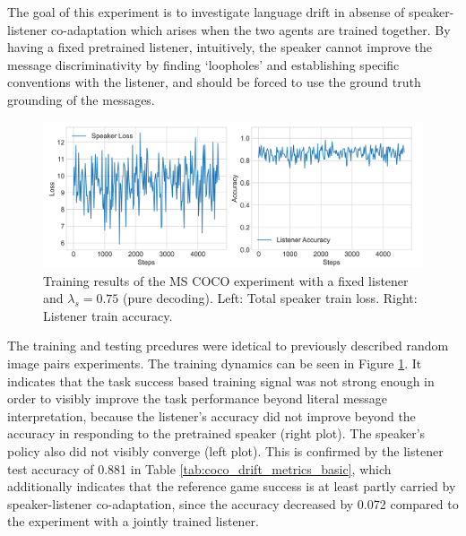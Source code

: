 The goal of this experiment is to investigate language drift in absense of speaker-listener co-adaptation which arises when the two agents are trained together. By having a fixed pretrained listener, intuitively, the speaker cannot improve the message discriminativity by finding `loopholes' and establishing specific conventions with the listener, and should be forced to use the ground truth grounding of the messages.

\begin{figure}
	\centering
	\includegraphics[width=\linewidth]{images/coco_fixedListener_baseline_random_075_losses.png}
	\caption{Training results of the MS COCO experiment with a fixed listener and $\lambda_s=0.75$ (pure decoding). Left: Total speaker train loss. Right: Listener train accuracy.}
	\label{fig:coco_fixed_listener_speaker_loss_listener_acc_075}
\end{figure}

The training and testing prcedures were idetical to previously described random image pairs experiments. The training dynamics can be seen in Figure \ref{fig:coco_fixed_listener_speaker_loss_listener_acc_075}. It indicates that the task success based training signal was not strong enough in order to visibly improve the task performance beyond literal message interpretation, because the listener's accuracy did not improve beyond the accuracy in responding to the pretrained speaker (right plot). The speaker's policy also did not visibly converge (left plot). 
This is confirmed by the listener test accuracy of 0.881 in Table \ref{tab:coco_drift_metrics_basic}, which additionally indicates that the reference game success is at least partly carried by speaker-listener co-adaptation, since the accuracy decreased by 0.072 compared to the experiment with a jointly trained listener. 

